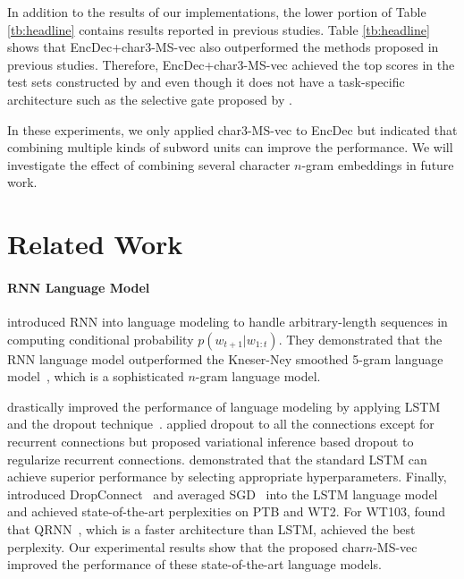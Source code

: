 \documentclass[letterpaper]{article} %
\begin{document}
In addition to the results of our implementations, the lower portion of Table \ref{tb:headline} contains results reported in previous studies.
Table \ref{tb:headline} shows that EncDec+char3-MS-vec also outperformed the methods proposed in previous studies.
Therefore, EncDec+char3-MS-vec achieved the top scores in the test sets constructed by \cite{zhou-EtAl:2017:Long} and \cite{kiyono} even though it does not have a task-specific architecture such as the selective gate proposed by \cite{zhou-EtAl:2017:Long}.

In these experiments, we only applied char3-MS-vec to EncDec but \cite{C18-1052} indicated that combining multiple kinds of subword units can improve the performance.
We will investigate the effect of combining several character $n$-gram embeddings in future work.



\section{Related Work}
\paragraph{RNN Language Model}
\cite{DBLP:conf/interspeech/MikolovKBCK10} introduced RNN into language modeling to handle arbitrary-length sequences in computing conditional probability $p(w_{t+1} | w_{1:t})$.
They demonstrated that the RNN language model outperformed the Kneser-Ney smoothed 5-gram language model~\cite{Chen:1996:ESS:981863.981904}, which is a sophisticated $n$-gram language model.

\cite{DBLP:journals/corr/ZarembaSV14} drastically improved the performance of language modeling by applying LSTM and the dropout technique~\cite{Srivastava:2014:DSW:2627435.2670313}.
\cite{DBLP:journals/corr/ZarembaSV14} applied dropout to all the connections except for recurrent connections but \cite{Gal2016Theoretically} proposed variational inference based dropout to regularize recurrent connections.
\cite{DBLP:journals/corr/MelisDB17} demonstrated that the standard LSTM can achieve superior performance by selecting appropriate hyperparameters.
Finally, \cite{merityRegOpt} introduced DropConnect~\cite{wan2013regularization} and averaged SGD~\cite{polyak1992acceleration} into the LSTM language model and achieved state-of-the-art perplexities on PTB and WT2.
For WT103, \cite{merityAnalysis} found that QRNN~\cite{DBLP:journals/corr/BradburyMXS16}, which is a faster architecture than LSTM, achieved the best perplexity.
Our experimental results show that the proposed char$n$-MS-vec improved the performance of these state-of-the-art language models.
\end{document}

